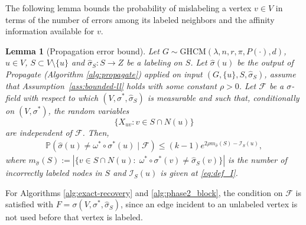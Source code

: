 \documentclass[11pt, a4paper]{amsart}
\newtheorem{lemma}[theorem]{Lemma}
\newcommand{\1}{\mathbf{1}}
\theoremstyle{definition}
\theoremstyle{remark}
\theoremstyle{definition}
\begin{document}
The following lemma bounds the probability of mislabeling a vertex $v\in V$ in terms of the number of errors among its labeled neighbors and the affinity information available for $v$.
\begin{lemma}[Propagation error bound]\label{lemma:one_step_error_bound}
 Let $G \sim \mathrm{GHCM}(\lambda,n,r,\pi,P(\cdot),d)$, $u \in V$, $S \subset V\setminus \{u\}$ and $\hat \sigma_S:S\to Z$ be a labeling on $S$. Let $\hat \sigma(u)$ be the output of Propagate (Algorithm \ref{alg:propagate}) applied on input $(G,\{u\},S,\hat \sigma_S)$, assume that Assumption~\ref{ass:bounded-ll} holds with some constant $\rho>0$. Let $\mathcal F$ be a $\sigma$-field with respect to which
$(V,\sigma^*,\widehat\sigma_S)$ is measurable and such that,
conditionally on $(V,\sigma^*)$, the random variables
\[
\{X_{uv}:v\in S\cap N(u)\}
\]
are independent of $\mathcal F$. Then,
    \begin{align*}
        \mathbb P(\hat\sigma(u) \neq \omega^* \circ \sigma^*(u) \mid \mathcal F) \leq (k-1)e^{2\rho m_{\hat \sigma}(S)-\mathcal I_S(u)},
    \end{align*}
    where $m_{\hat \sigma}(S):=|\{v \in S \cap N(u):\;\omega^* \circ \sigma^*(v)\neq \hat \sigma_S(v)\}|$ is the number of incorrectly labeled nodes in $S$ and $\mathcal I_S(u)$ is given at \eqref{eq:def_I}.
\end{lemma}
For Algorithms \ref{alg:exact-recovery} and \ref{alg:phase2_block}, the condition on $\mathcal F$ is satisfied with $F=\sigma(V,\sigma^*,\hat \sigma_S)$, since an edge incident to an unlabeled vertex is
not used before that vertex is labeled.
\end{document}
